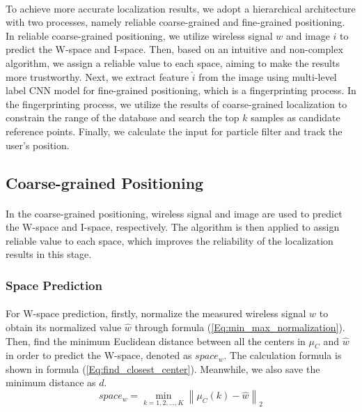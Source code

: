 \documentclass[a4paper,12pt]{report}
\begin{document}
\paragraph{}
To achieve more accurate localization results, we adopt a hierarchical architecture with two processes, namely reliable coarse-grained and fine-grained positioning. In reliable coarse-grained positioning, we utilize wireless signal $w$ and image $i$ to predict the W-space and I-space. Then, based on an intuitive and non-complex algorithm, we assign a reliable value to each space, aiming to make the results more trustworthy. Next, we extract feature $\hat{i}$ from the image using multi-level label CNN model for fine-grained positioning, which is a fingerprinting process. In the fingerprinting process, we utilize the results of coarse-grained localization to constrain the range of the database and search the top $k$ samples as candidate reference points. Finally, we calculate the input for particle filter and track the user's position. 
\subsection{Coarse-grained Positioning}
\paragraph{}
In the coarse-grained positioning, wireless signal and image are used to predict the W-space and I-space, respectively. The algorithm is then applied to assign reliable value to each space, which improves the reliability of the localization results in this stage.

\subsubsection{Space Prediction}
\paragraph{}
For W-space prediction, firstly, normalize the measured wireless signal $w$ to obtain its normalized value $\hat{w}$ through formula (\ref{Eq:min_max_normalization}). Then, find the minimum Euclidean distance between all the centers in $\mu_C$ and $\hat{w}$ in order to predict the W-space, denoted as $space_w$. The calculation formula is shown in formula (\ref{Eq:find_closest_center}). Meanwhile, we also save the minimum distance as $d$. 
\begin{equation}
    \label{Eq:find_closest_center}
    space_w=\min_{k=1,2,\dots,K} \left\| \mu_C(k)-\hat{w} \right\|_2
\end{equation}
\end{document}
